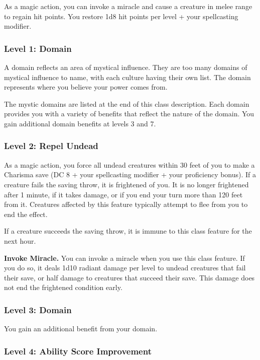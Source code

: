 \documentclass[12pt,letterpaper,twocolumn,openany,nodeprecatedcode,bg=none]{dndbook}
\begin{document}
As a magic action, you can invoke a miracle and cause a creature in
melee range to regain hit points. You restore 1d8 hit points per level +
your spellcasting modifier.

\subsubsection{Level 1: Domain}\label{level-1-domain}

A domain reflects an area of mystical influence. They are too many
domains of mystical influence to name, with each culture having their
own list. The domain represents where you believe your power comes from.

The mystic domains are listed at the end of this class description. Each
domain provides you with a variety of benefits that reflect the nature
of the domain. You gain additional domain benefits at levels 3 and 7.

\subsubsection{Level 2: Repel Undead}\label{level-2-repel-undead}

As a magic action, you force all undead creatures within 30 feet of you
to make a Charisma save (DC 8 + your spellcasting modifier + your
proficiency bonus). If a creature fails the saving throw, it is
frightened of you. It is no longer frightened after 1 minute, if it
takes damage, or if you end your turn more than 120 feet from it.
Creatures affected by this feature typically attempt to flee from you to
end the effect.

If a creature succeeds the saving throw, it is immune to this class
feature for the next hour.

\textbf{Invoke Miracle.} You can invoke a miracle when you use this
class feature. If you do so, it deals 1d10 radiant damage per level to
undead creatures that fail their save, or half damage to creatures that
succeed their save. This damage does not end the frightened condition
early.

\subsubsection{Level 3: Domain}\label{level-3-domain}

You gain an additional benefit from your domain.

\subsubsection{Level 4: Ability Score
Improvement}\label{level-4-ability-score-improvement}
\end{document}
